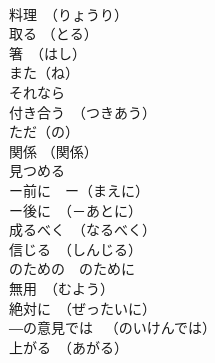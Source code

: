 \documentclass[8pt]{extreport}
\begin{document}
\begin{CJK}{UTF8}{min}
\\	料理　（りょうり）	
\\	取る （とる）	
\\	箸　（はし）	
\\	また（ね）	
\\	それなら	
\\	付き合う　（つきあう）	
\\	ただ（の）	
\\	関係 （関係）	
\\	見つめる	
\\	ー前に　ー（まえに）	
\\	ー後に　（－あとに）	
\\	成るべく　（なるべく）	
\\	信じる　（しんじる）	
\\	のための　のために 
\\	無用　（むよう）	
\\	絶対に　（ぜったいに）	
\\	―の意見では 　（のいけんでは）	
\\	上がる　（あがる）	
\end{CJK}
\end{document}
